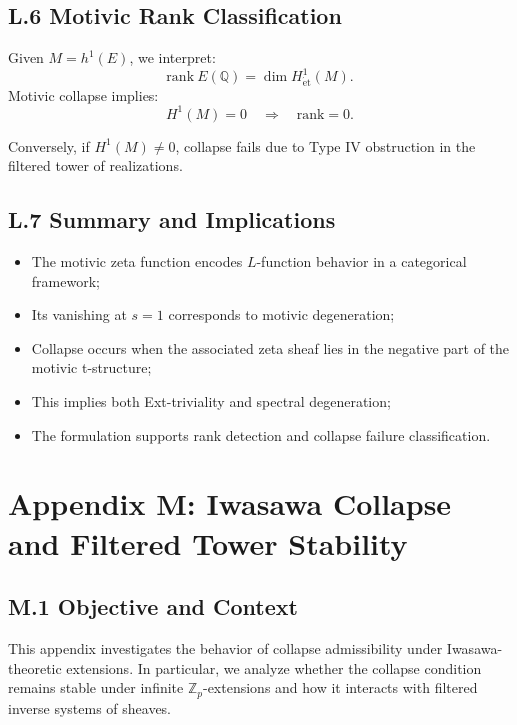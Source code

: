 \documentclass[11pt]{article}
\begin{document}
\subsection*{L.6 Motivic Rank Classification}

Given \( M = h^1(E) \), we interpret:
\[
\mathrm{rank}~E(\mathbb{Q}) = \dim H^1_{\mathrm{\acute{e}t}}(M).
\]
Motivic collapse implies:
\[
H^1(M) = 0 \quad \Rightarrow \quad \mathrm{rank} = 0.
\]

Conversely, if \( H^1(M) \neq 0 \), collapse fails due to Type IV obstruction in the filtered tower of realizations.

\subsection*{L.7 Summary and Implications}

\begin{itemize}
  \item The motivic zeta function encodes \( L \)-function behavior in a categorical framework;
  \item Its vanishing at \( s=1 \) corresponds to motivic degeneration;
  \item Collapse occurs when the associated zeta sheaf lies in the negative part of the motivic t-structure;
  \item This implies both Ext-triviality and spectral degeneration;
  \item The formulation supports rank detection and collapse failure classification.
\end{itemize}



\appendix
\section*{Appendix M: Iwasawa Collapse and Filtered Tower Stability}

\subsection*{M.1 Objective and Context}

This appendix investigates the behavior of collapse admissibility under Iwasawa-theoretic extensions. In particular, we analyze whether the collapse condition remains stable under infinite \( \mathbb{Z}_p \)-extensions and how it interacts with filtered inverse systems of sheaves.
\end{document}

